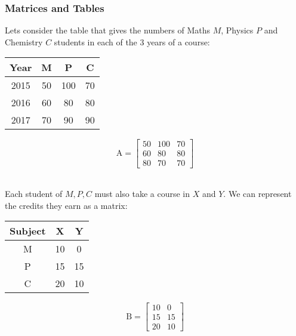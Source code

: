 \documentclass[a4paper, 9pt]{extarticle}
\begin{document}
\subsubsection*{Matrices and Tables}
Lets consider the table that gives the numbers of Maths $M$, Physics $P$ and Chemistry $C$ students in each of the 3 years of a course: \\[2ex]
\begin{minipage}{0.5\textwidth}
  \begin{center}
    \begin{tabularx}{0.6\textwidth}{c | c c c}
      \toprule
      Year & M  & P   & C  \\
      \midrule
      2015 & 50 & 100 & 70 \\
      2016 & 60 & 80  & 80 \\
      2017 & 70 & 90  & 90 \\
      \bottomrule
    \end{tabularx}
  \end{center}
\end{minipage}
\begin{minipage}{0.5\textwidth}
  \begin{center}
    $$\mathrm{A}=
      \begin{bmatrix}
        50 & 100 & 70 \\
        60 & 80  & 80 \\
        80 & 70  & 70
      \end{bmatrix}
    $$
  \end{center}
\end{minipage} \\[2ex]
Each student of $M, P, C$ must also take a course in $X$ and $Y$. We can represent the credits they earn as a matrix: \\[2ex]
\begin{minipage}
  {0.5\textwidth}
  \begin{center}
    \begin{tabularx}{0.6\textwidth}{c | c c}
      \toprule
      Subject & X  & Y  \\
      \midrule
      M       & 10 & 0  \\
      P       & 15 & 15 \\
      C       & 20 & 10 \\
      \bottomrule
    \end{tabularx}
  \end{center}
\end{minipage}
\begin{minipage}{0.5\textwidth}
  \begin{center}
    $$\mathrm{B}=
      \begin{bmatrix}
        10 & 0  \\
        15 & 15 \\
        20 & 10
      \end{bmatrix}
    $$
  \end{center}
\end{minipage} \\[2ex]
\end{document}
